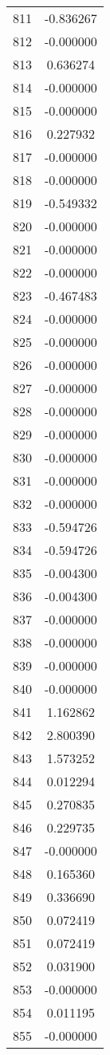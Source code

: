 \documentclass[12pt]{article}
\begin{document}
\begin{longtable}{@{}cc@{}}
811 & -0.836267 \\
812 & -0.000000 \\
813 & 0.636274 \\
814 & -0.000000 \\
815 & -0.000000 \\
816 & 0.227932 \\
817 & -0.000000 \\
818 & -0.000000 \\
819 & -0.549332 \\
820 & -0.000000 \\
821 & -0.000000 \\
822 & -0.000000 \\
823 & -0.467483 \\
824 & -0.000000 \\
825 & -0.000000 \\
826 & -0.000000 \\
827 & -0.000000 \\
828 & -0.000000 \\
829 & -0.000000 \\
830 & -0.000000 \\
831 & -0.000000 \\
832 & -0.000000 \\
833 & -0.594726 \\
834 & -0.594726 \\
835 & -0.004300 \\
836 & -0.004300 \\
837 & -0.000000 \\
838 & -0.000000 \\
839 & -0.000000 \\
840 & -0.000000 \\
841 & 1.162862 \\
842 & 2.800390 \\
843 & 1.573252 \\
844 & 0.012294 \\
845 & 0.270835 \\
846 & 0.229735 \\
847 & -0.000000 \\
848 & 0.165360 \\
849 & 0.336690 \\
850 & 0.072419 \\
851 & 0.072419 \\
852 & 0.031900 \\
853 & -0.000000 \\
854 & 0.011195 \\
855 & -0.000000 \\

\end{longtable}
\end{document}
